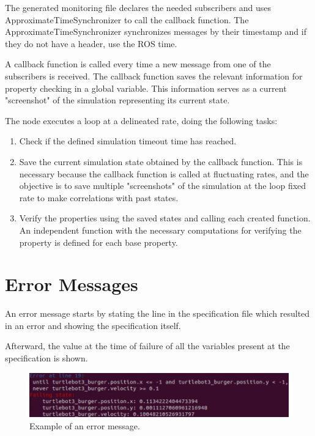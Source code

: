 
The generated monitoring file declares the needed subscribers and uses ApproximateTimeSynchronizer to call the callback function. The ApproximateTimeSynchronizer synchronizes messages by their timestamp and if they do not have a header, use the ROS time.

A callback function is called every time a new message from one of the subscribers is received. The callback function saves the relevant information for property checking in a global variable. This information serves as a current "screenshot" of the simulation representing its current state.

The node executes a loop at a delineated rate, doing the following tasks:

\begin{enumerate}
    \item Check if the defined simulation timeout time has reached.
    \item Save the current simulation state obtained by the callback function. This is necessary because the callback function is called at fluctuating rates, and the objective is to save multiple "screenshots" of the simulation at the loop fixed rate to make correlations with past states.
    \item Verify the properties using the saved states and calling each created function. An independent function with the necessary computations for verifying the property is defined for each base property.
\end{enumerate}


\section{Error Messages}
\label{sec:errormessages}

An error message starts by stating the line in the specification file which resulted in an error and showing the specification itself.

Afterward, the value at the time of failure of all the variables present at the specification is shown.

\begin{figure}[htb]
\includegraphics[width=\textwidth]{images/error_message1.png}
\caption{Example of an error message.} \label{fig:monerror}
\end{figure}
